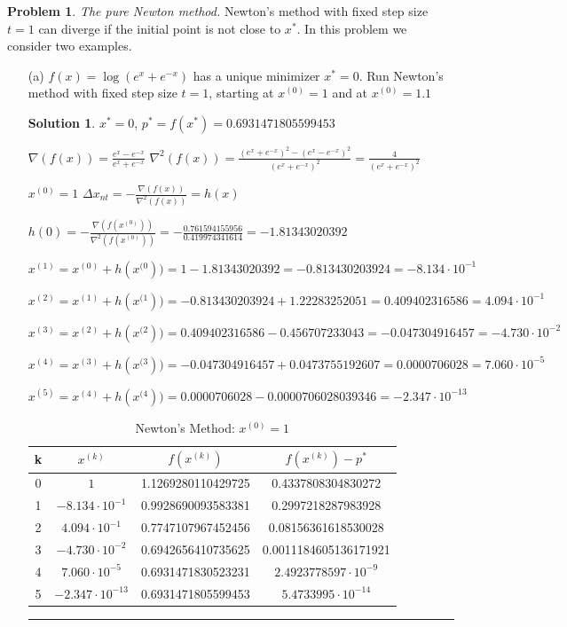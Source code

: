 \documentclass{article}
\theoremstyle{definition}
\newtheorem{problem}{Problem}
\def\fline{\rule{0.75\linewidth}{0.5pt}}
\newcommand{\finishline}{\begin{center}\fline\end{center}}
\newtheorem*{solution*}{Solution}
\newenvironment{solution}{\begin{solution*}}{{\finishline} \end{solution*}}
\begin{document}
\begin{problem} \textit{The pure Newton method.} Newton’s method with fixed step size $t = 1$ can diverge if the initial point is not close to $x^*$. In this problem we consider two examples. 
\begin{enumerate}
    \item[(a)] $f(x) = \log{(e^x + e^{-x})}$ has a unique minimizer $x^* = 0$. Run Newton’s method with fixed step size $t = 1$, starting at $x^{(0)} = 1$ and at $x^{(0)} = 1.1$
    \begin{solution} $x^{*} = 0$, $p^{*} = f(x^{*}) = 0.6931471805599453$

    $\nabla(f(x)) = \frac{e^x - e^{-x}}{e^x + e^{-x}}$ \newline 
    $\nabla^2(f(x)) = \frac{(e^x + e^{-x})^2 - (e^x - e^{-x})^2}{(e^x + e^{-x})^2} = \frac{4}{(e^x + e^{-x})^2}$

    $x^{(0)} = 1$ \newline 
    $\Delta x_{nt} = -\frac{\nabla(f(x))}{\nabla^2(f(x))} = h(x)$ \newline 

    $h(0) = -\frac{\nabla(f(x^{(0)}))}{\nabla^2(f(x^{(0)}))} = - \frac{0.761594155956}{0.419974341614} = -1.81343020392$ \newline 

    $x^{(1)} = x^{(0)} + h(x^{(0})) = 1 - 1.81343020392 = -0.813430203924 = -8.134 \cdot 10^{-1}$

    $x^{(2)} = x^{(1)} + h(x^{(1})) = -0.813430203924 + 1.22283252051 = 0.409402316586 = 4.094 \cdot 10^{-1}$

    $x^{(3)} = x^{(2)} + h(x^{(2})) = 0.409402316586 - 0.456707233043 = - 0.047304916457 = -4.730 \cdot 10^{-2}$

    $x^{(4)} = x^{(3)} + h(x^{(3})) = -0.047304916457 + 0.0473755192607 = 0.0000706028 = 7.060 \cdot 10^{-5}$
    
    $x^{(5)} = x^{(4)} + h(x^{(4})) = 0.0000706028 - 0.0000706028039346 = -2.347 \cdot 10^{-13}$

    \begin{table}[h]
    \centering
    \begin{tabular}{|c|c|c|c|}
        \hline
        k & $x^{(k)}$ & $f(x^{(k)})$ & $f(x^{(k)}) - p^*$ \\
        \hline
        0 & $1$ & 1.1269280110429725 & 0.4337808304830272 \\
        1 & $-8.134 \cdot 10^{-1}$ & 0.9928690093583381 & 0.2997218287983928 \\
        2 & $4.094 \cdot 10^{-1}$ & 0.7747107967452456 & 0.08156361618530028\\
        3 & $-4.730 \cdot 10^{-2}$ & 0.6942656410735625 & 0.0011184605136171921\\
        4 & $7.060 \cdot 10^{-5}$ & 0.6931471830523231 & $2.4923778597 \cdot 10^{-9}$\\
        5 & $-2.347 \cdot 10^{-13}$ & 0.6931471805599453 & $5.4733995 \cdot 10^{-14}$\\
        \hline
    \end{tabular}
    \caption{Newton's Method: $x^{(0)} = 1$}
    \label{tab:mytable}
\end{table}



\end{solution}
\end{enumerate}
\end{problem}
\end{document}
